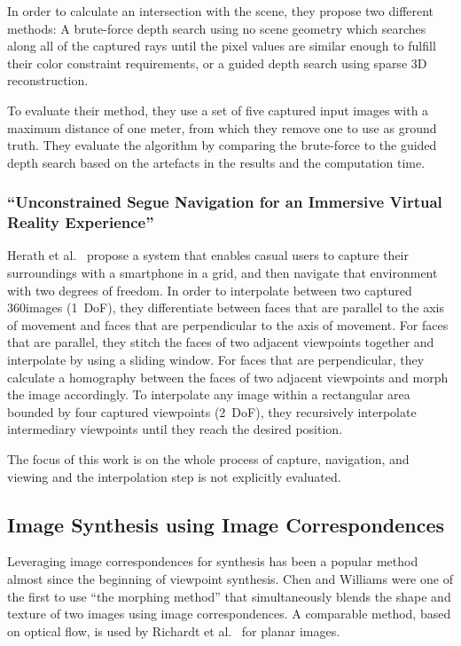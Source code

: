 In order to calculate an intersection with the scene, they propose two different methods: A brute-force depth search using no scene geometry which searches along all of the captured rays until the pixel values are similar enough to fulfill their color constraint requirements, or a guided depth search using sparse 3D reconstruction.

To evaluate their method, they use a set of five captured input images with a maximum distance of one meter, from which they remove one to use as ground truth. They evaluate the algorithm by comparing the brute-force to the guided depth search based on the artefacts in the results and the computation time.

\subsubsection{``Unconstrained Segue Navigation for an Immersive Virtual Reality Experience'' \cite{segue}}
Herath et al.\ \cite{segue} propose a system that enables casual users to capture their surroundings with a smartphone in a grid, and then navigate that environment with two degrees of freedom. In order to interpolate between two captured 360\degree images (1~DoF), they differentiate between faces that are parallel to the axis of movement and faces that are perpendicular to the axis of movement. For faces that are parallel, they stitch the faces of two adjacent viewpoints together and interpolate by using a sliding window. For faces that are perpendicular, they calculate a homography between the faces of two adjacent viewpoints and morph the image accordingly. To interpolate any image within a rectangular area bounded by four captured viewpoints (2~DoF), they recursively interpolate intermediary viewpoints until they reach the desired position.

The focus of this work is on the whole process of capture, navigation, and viewing and the interpolation step is not explicitly evaluated.

\subsection{Image Synthesis using Image Correspondences}
Leveraging image correspondences for synthesis has been a popular method almost since the beginning of viewpoint synthesis. Chen and Williams \cite{apple} were one of the first to use ``the morphing method'' that simultaneously blends the shape and texture of two images using image correspondences. A comparable method, based on optical flow, is used by Richardt et al.\ \cite{megastereo} for planar images.

